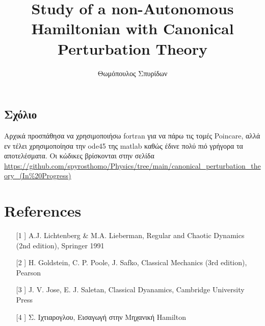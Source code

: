 \documentclass[a4paper,11pt, floatperchapter]{book}
\title{Study of a non-Autonomous Hamiltonian with Canonical Perturbation Theory}
\author{Θωμόπουλος Σπυρίδων}
\begin{document}

	



\tableofcontents
\begin{changemargin}{2cm}{2cm} 
\vspace{10cm}
	\section*{Σχόλιο} 
	Αρχικά προσπάθησα να χρησιμοποιήσω fortran για να πάρω τις τομές Poincare, αλλά εν τέλει χρησιμοποίησα την ode45 της matlab καθώς έδινε πολύ πιό γρήγορα τα αποτελέσματα. Oι κώδικες βρίσκονται στην σελίδα \url{https://github.com/spyrosthomo/Physics/tree/main/canonical_perturbation_theory_(In\%20Progress)}
	\let\cleardoublepage\clearpage
\end{changemargin}

\let\cleardoublepage\clearpage




\section*{References}
\begin{itemize}
	\item[[1]] A.J. Lichtenberg \& M.A. Lieberman, Regular and Chaotic Dynamics (2nd edition), Springer 1991
	\item[[2]] H. Goldstein, C. P. Poole, J. Safko, Classical Mechanics (3rd edition), Pearson
	\item[[3]] J. V. Jose, E. J. Saletan, Classical Dyanamics, Cambridge University Press
	\item[[4]] Σ. Ιχτιαρογλου, Εισαγωγή στην Μηχανική Hamilton
\end{itemize}
\end{document}
